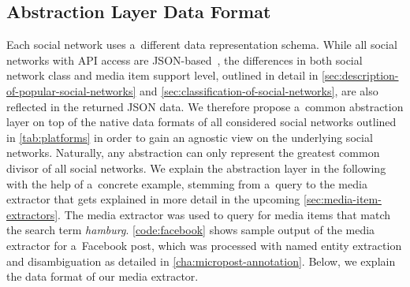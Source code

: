 \subsection{Abstraction Layer Data Format}
\label{sec:data-format}

Each social network uses a~different data representation schema.
While all social networks with API access are
JSON-based~\cite{crockford2006json}, the differences in both 
social network class and media item support level,
outlined in detail in
\autoref{sec:description-of-popular-social-networks} and
\autoref{sec:classification-of-social-networks},
are also reflected in the returned JSON data.
We therefore propose a~common abstraction layer 
on top of the native data formats of all considered social networks
outlined in \autoref{tab:platforms} in order to gain
an agnostic view on the underlying social networks.
Naturally, any abstraction can only represent the
greatest common divisor of all social networks.
We explain the abstraction layer in the following
with the help of a~concrete example,
stemming from a~query to the media extractor
that gets explained in more detail
in the upcoming \autoref{sec:media-item-extractors}.
The media extractor was used to query for media items
that match the search term \emph{hamburg}.
\autoref{code:facebook} shows sample output of the media extractor
for a~Facebook post, which was processed
with named entity extraction and disambiguation 
as detailed in \autoref{cha:micropost-annotation}.
Below, we explain the data format of our media extractor.


